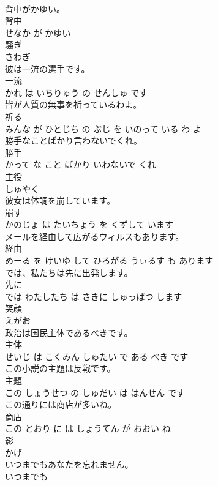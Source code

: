 \documentclass[8pt]{extreport}
\begin{document}
\begin{CJK}{UTF8}{min}
\\	背中がかゆい。	
\\	背中 
\\	せなか が かゆい			
\\	騒ぎ	
\\	さわぎ			
\\	彼は一流の選手です。	
\\	一流 
\\	かれ は いちりゅう の せんしゅ です			
\\	皆が人質の無事を祈っているわよ。	
\\	祈る 
\\	みんな が ひとじち の ぶじ を いのって いる わ よ			
\\	勝手なことばかり言わないでくれ。	
\\	勝手 
\\	かって な こと ばかり いわないで くれ			
\\	主役	
\\	しゅやく			
\\	彼女は体調を崩しています。	
\\	崩す 
\\	かのじょ は たいちょう を くずして います			
\\	メールを経由して広がるウィルスもあります。	
\\	経由 
\\	めーる を けいゆ して ひろがる うぃるす も あります			
\\	では、私たちは先に出発します。	
\\	先に 
\\	では わたしたち は さきに しゅっぱつ します			
\\	笑顔	
\\	えがお			
\\	政治は国民主体であるべきです。	
\\	主体 
\\	せいじ は こくみん しゅたい で ある べき です			
\\	この小説の主題は反戦です。	
\\	主題 
\\	この しょうせつ の しゅだい は はんせん です			
\\	この通りには商店が多いね。	
\\	商店 
\\	この とおり に は しょうてん が おおい ね			
\\	影	
\\	かげ			
\\	いつまでもあなたを忘れません。	
\\	いつまでも 

\end{CJK}
\end{document}
